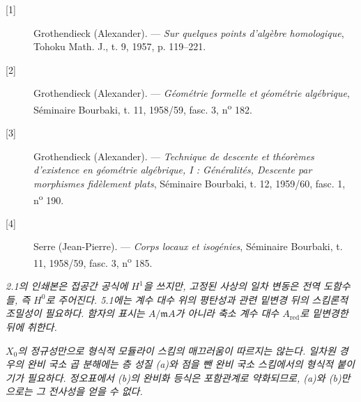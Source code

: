 \begin{description}
  \item[{[1]}] Grothendieck (Alexander). --- \emph{Sur quelques points
    d'algèbre homologique}, Tohoku Math. J., t. 9, 1957, p. 119--221.
  \item[{[2]}] Grothendieck (Alexander). --- \emph{Géométrie formelle et
    géométrie algébrique}, Séminaire Bourbaki, t. 11, 1958/59, fasc. 3,
    n\textsuperscript{o} 182.
  \item[{[3]}] Grothendieck (Alexander). --- \emph{Technique de descente et
    théorèmes d'existence en géométrie algébrique, I : Généralités, Descente
    par morphismes fidèlement plats}, Séminaire Bourbaki, t. 12, 1959/60,
    fasc. 1, n\textsuperscript{o} 190.
  \item[{[4]}] Serre (Jean-Pierre). --- \emph{Corps locaux et isogénies},
    Séminaire Bourbaki, t. 11, 1958/59, fasc. 3, n\textsuperscript{o} 185.
\end{description}

\par\smallskip
\begingroup\footnotesize


\noindent\textit{2.1의 인쇄본은 접공간 공식에 $H^1$을 쓰지만, 고정된 사상의 일차 변동은 전역 도함수들, 즉 $H^0$로 주어진다. 5.1에는 계수 대수 위의 평탄성과 관련 밑변경 뒤의 스킴론적 조밀성이 필요하다. 함자의 표시는 $A/\mathfrak mA$가 아니라 축소 계수 대수 $A_{\mathrm{red}}$로 밑변경한 뒤에 취한다.}\par
\noindent\textit{$X_0$의 정규성만으로 형식적 모듈라이 스킴의 매끄러움이 따르지는 않는다. 일차원 경우의 완비 국소 곱 분해에는 층 성질 (a)와 점을 뺀 완비 국소 스킴에서의 형식적 붙이기가 필요하다. 정오표에서 (b)의 완비화 등식은 포함관계로 약화되므로, (a)와 (b)만으로는 그 전사성을 얻을 수 없다.}\par
\endgroup
